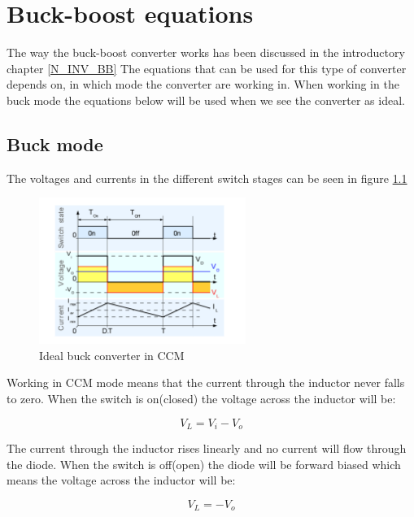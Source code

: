 \chapter{Buck-boost equations}\label{ch:Appbuckboost}

The way the buck-boost converter works has been discussed in the introductory chapter \ref{N_INV_BB} The equations that can be used for this type of converter depends on, in which mode the converter are working in. When working in the buck mode the equations below will be used when we see the converter as ideal. 

\section{Buck mode}

The voltages and currents in the different switch stages can be seen in figure \ref{CCM_buck}

\begin{figure}[htbp]
	\begin{center}
		\includegraphics[width=0.6\textwidth]{../Pictures/CCM_buck}
		\caption{Ideal buck converter in CCM \cite{CCM_buck}}
		\label{CCM_buck}
	\end{center}	
\end{figure}

Working in CCM mode means that the current through the inductor never falls to zero. When the switch is on(closed) the voltage across the inductor will be: 

\begin{equation}
V_L = V_i-V_o
\end{equation} 

The current through the inductor rises linearly and no current will flow through the diode.
When the switch is off(open) the diode will be forward biased which means the voltage across the inductor will be:

\begin{equation}
V_L = -V_o
\end{equation} 

